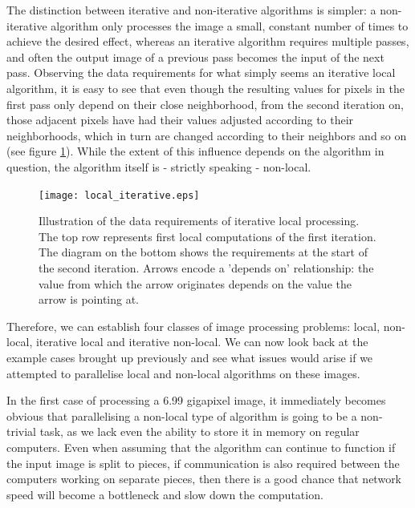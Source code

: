 \documentclass [12pt,a4paper]{report}
\begin{document}
The distinction between iterative and non-iterative algorithms is simpler: a non-iterative algorithm only processes the image a small, constant number of times to achieve the desired effect, whereas an iterative algorithm requires multiple passes, and often the output image of a previous pass becomes the input of the next pass. Observing the data requirements for what simply seems an iterative local algorithm, it is easy to see that even though the resulting values for pixels in the first pass only depend on their close neighborhood, from the second iteration on, those adjacent pixels have had their values adjusted according to their neighborhoods, which in turn are changed according to their neighbors and so on (see figure \ref{fig_local_iterative}). While the extent of this influence depends on the algorithm in question, the algorithm itself is - strictly speaking - non-local.

\begin{figure}[h]
\begin{center}
\texttt{[image: local\_iterative.eps]} %
\caption[Data requirements of iterative local processing]{Illustration of the data requirements of iterative local processing. The top row represents first local computations of the first iteration. The diagram on the bottom shows the requirements at the start of the second iteration. Arrows encode a 'depends on' relationship: the value from which the arrow originates depends on the value the arrow is pointing at.}
\label{fig_local_iterative}
\end{center}
\end{figure}

Therefore, we can establish four classes of image processing problems: local, non-local, iterative local and iterative non-local. We can now look back at the example cases brought up previously and see what issues would arise if we attempted to parallelise local and non-local algorithms on these images.

In the first case of processing a 6.99 gigapixel image, it immediately becomes obvious that parallelising a non-local type of algorithm is going to be a non-trivial task, as we lack even the ability to store it in memory on regular computers. Even when assuming that the algorithm can continue to function if the input image is split to pieces, if communication is also required between the computers working on separate pieces, then there is a good chance that network speed will become a bottleneck and slow down the computation.
\end{document}
